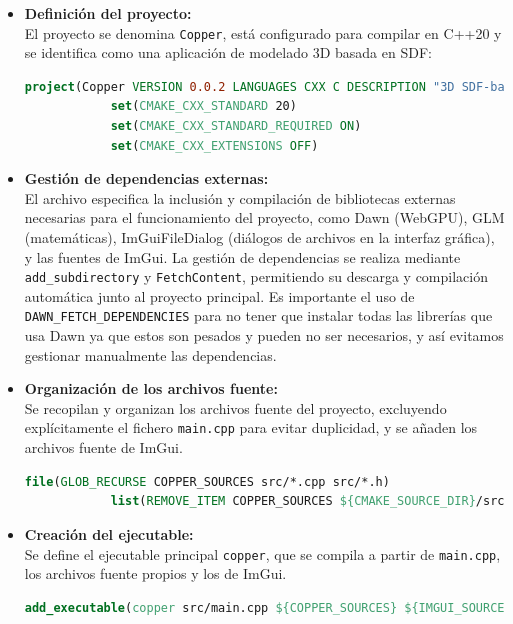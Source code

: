 \begin{itemize}
    \item \textbf{Definición del proyecto:}\\
          El proyecto se denomina \texttt{Copper}, está configurado para compilar en C++20 y se identifica como una aplicación de modelado 3D basada en SDF:
          \begin{lstlisting}[language=CMake, caption={Definición del proyecto en CMakeLists.txt}]
            project(Copper VERSION 0.0.2 LANGUAGES CXX C DESCRIPTION "3D SDF-based modeling application")
            set(CMAKE_CXX_STANDARD 20)
            set(CMAKE_CXX_STANDARD_REQUIRED ON)
            set(CMAKE_CXX_EXTENSIONS OFF)
\end{lstlisting}

    \item \textbf{Gestión de dependencias externas:}\\
          El archivo especifica la inclusión y compilación de bibliotecas externas necesarias para el funcionamiento del proyecto, como Dawn (WebGPU), GLM (matemáticas), ImGuiFileDialog (diálogos de archivos en la interfaz gráfica), y las fuentes de ImGui. La gestión de dependencias se realiza mediante \texttt{add\_subdirectory} y \texttt{FetchContent}, permitiendo su descarga y compilación automática junto al proyecto principal.
          Es importante el uso de \texttt{DAWN\_FETCH\_DEPENDENCIES} para no tener que instalar todas las librerías que usa Dawn ya que estos son pesados y pueden no ser necesarios, y así evitamos gestionar manualmente las dependencias.

    \item \textbf{Organización de los archivos fuente:}\\
          Se recopilan y organizan los archivos fuente del proyecto, excluyendo explícitamente el fichero \texttt{main.cpp} para evitar duplicidad, y se añaden los archivos fuente de ImGui.
          \begin{lstlisting}[language=CMake, caption={Organización de los archivos fuente en CMakeLists.txt}]
            file(GLOB_RECURSE COPPER_SOURCES src/*.cpp src/*.h)
            list(REMOVE_ITEM COPPER_SOURCES ${CMAKE_SOURCE_DIR}/src/main.cpp)\end{lstlisting}

    \item \textbf{Creación del ejecutable:}\\
          Se define el ejecutable principal \texttt{copper}, que se compila a partir de \texttt{main.cpp}, los archivos fuente propios y los de ImGui.
          \begin{lstlisting}[language=CMake, caption={Creación del ejecutable en CMakeLists.txt}]
    add_executable(copper src/main.cpp ${COPPER_SOURCES} ${IMGUI_SOURCES})\end{lstlisting}


\end{itemize}
